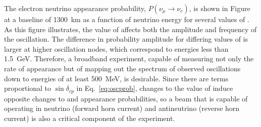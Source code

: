 The electron neutrino appearance probability, $P(\nu_\mu \rightarrow \nu_e)$, 
is shown in 
Figure %
at a baseline of 1300~km as a function of neutrino 
energy for several values of \deltacp. As this figure illustrates, the value 
of \deltacp affects both the amplitude and frequency of
the oscillation. The difference in probability amplitude
for differing values of \deltacp is larger at higher oscillation nodes, which 
correspond to energies less than 1.5~GeV. Therefore, a broadband experiment, 
capable of measuring not only the rate of \nue appearance but of mapping out the 
spectrum of observed oscillations down to energies of at least 500~MeV, 
is desirable. Since there are terms proportional to $\sin\delta_{cp}$ in Eq.~\ref{eq:oscprob},
changes to the value of \deltacp induce opposite changes to \nue and
\anue appearance probabilities, so a beam that is capable of operating in
neutrino (forward horn current) and antineutrino (reverse horn current)
is also a critical component of the experiment.
%

